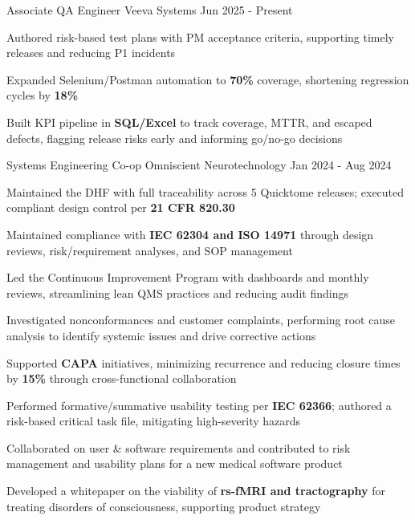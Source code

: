 \documentclass[11pt, a4paper]{russell}
\begin{document}
\begin{cventries}
\cventry
  {Associate QA Engineer} %
  {Veeva Systems} %
  {} %
  {Jun 2025 - Present} %
  {
    \begin{cvitems}
        \item {Authored risk-based test plans with PM acceptance criteria, supporting timely releases and reducing P1 incidents}
        \item {Expanded Selenium/Postman automation to \textbf{70\%} coverage, shortening regression cycles by \textbf{18\%}}
        \item {Built KPI pipeline in \textbf{SQL/Excel} to track coverage, MTTR, and escaped defects, flagging release risks early and informing go/no-go decisions}
    \end{cvitems}
  }

\cventry
  {Systems Engineering Co-op} %
  {Omniscient Neurotechnology} %
  {} %
  {Jan 2024 - Aug 2024} %
  {
    \begin{cvitems}
        \item {Maintained the DHF with full traceability across 5 Quicktome releases; executed compliant design control per \textbf{21 CFR 820.30}}
        \item {Maintained compliance with \textbf{IEC 62304 and ISO 14971} through design reviews, risk/requirement analyses, and SOP management}
        \item {Led the Continuous Improvement Program with dashboards and monthly reviews, streamlining lean QMS practices and reducing audit findings}
        \item {Investigated nonconformances and customer complaints, performing root cause analysis to identify systemic issues and drive corrective actions}
      \item {Supported \textbf{CAPA} initiatives, minimizing recurrence and reducing closure times by \textbf{15\%} through cross-functional collaboration}
        \item {Performed formative/summative usability testing per \textbf{IEC 62366}; authored a risk-based critical task file, mitigating high-severity hazards}
        \item {Collaborated on user \& software requirements and contributed to risk management and usability plans for a new medical software product}
        \item {Developed a whitepaper on the viability of \textbf{rs-fMRI and tractography} for treating disorders of consciousness, supporting product strategy}
    \end{cvitems}
  }


\end{cventries}
\end{document}
